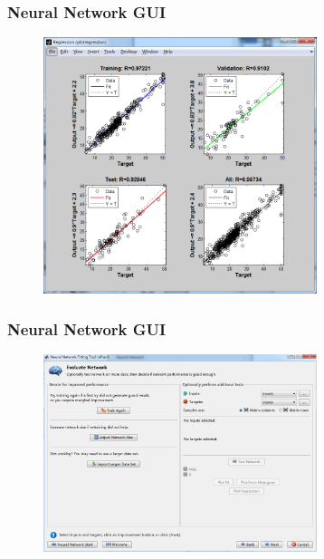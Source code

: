 \documentclass[slidestop,compress,mathserif,c]{beamer}
\begin{document}
\begin{frame}
\frametitle{Neural Network GUI}

\begin{figure}
\centering
\includegraphics[width=8cm]{7}
\end{figure}
\end{frame}

\begin{frame}
\frametitle{Neural Network GUI}

\begin{figure}
\centering
\includegraphics[width=8cm]{11}
\end{figure}
\end{frame}
\end{document}
